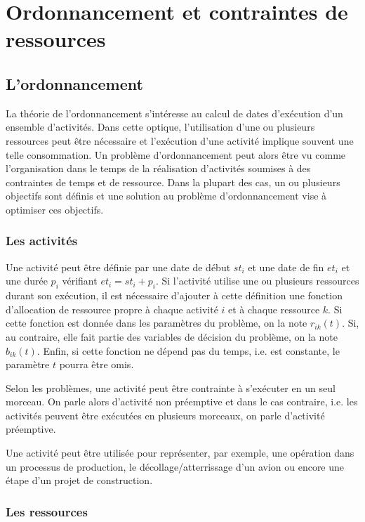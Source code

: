 \section{Ordonnancement et contraintes de ressources}
\label{sec:ordo}
\subsection{L'ordonnancement}
\label{sec:ordo_def}
La théorie de l'ordonnancement s'intéresse au calcul de dates
d'exécution d'un ensemble d'activités. Dans cette optique,
l'utilisation d'une ou plusieurs ressources peut être nécessaire et
l'exécution d'une activité implique souvent une telle consommation. Un
problème d'ordonnancement peut alors être vu comme l'organisation dans
le temps de la réalisation d'activités soumises à des contraintes de
temps et de ressource. Dans la plupart des cas, un ou plusieurs
objectifs sont définis et une solution au problème d'ordonnancement 
vise à optimiser ces objectifs.
 
\subsubsection{Les activités}

Une activité peut être définie par une date de début $st_i$ et une date
de fin $et_i$ et une durée $p_i$ vérifiant $et_i=st_i+p_i$. Si
l'activité utilise une ou plusieurs ressources durant son exécution, il
est nécessaire d'ajouter à cette définition une fonction d'allocation
de ressource propre à chaque activité $i$ et à chaque
ressource $k$. Si cette fonction est donnée dans les paramètres du
problème, on la note $r_{ik}(t)$. Si, au contraire, elle fait partie
des variables de décision du problème, on la note $b_{ik}(t)$. Enfin,
si cette fonction ne dépend pas du temps, i.e. est constante, le
paramètre $t$ pourra être omis. 

Selon les problèmes, une activité peut être contrainte à s'exécuter en
un seul morceau. On parle alors d'activité non préemptive et dans le
cas contraire, i.e. les activités peuvent être exécutées en plusieurs
morceaux, on parle d'activité préemptive.

Une activité peut être utilisée pour représenter, par exemple, une
opération dans un processus de production, le décollage/atterrissage
d'un avion ou encore une étape d'un projet de construction.

\subsubsection{Les ressources}

